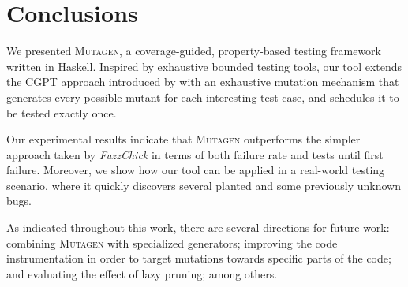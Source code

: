 \documentclass[sigconf, anonymous, review]{acmart}
\newcommand{\fuzzchick}{\textit{FuzzChick}\xspace}
\newcommand{\mutagen}{\textsc{Mutagen}\xspace}
\begin{document}

\section{Conclusions}
\label{sec:conclusions}

We presented \mutagen, a coverage-guided, property-based testing framework
written in Haskell.
%
Inspired by exhaustive bounded testing tools, our tool extends the CGPT approach
introduced by \citeauthor{lampropoulos2019coverage} with an exhaustive mutation
mechanism that generates every possible mutant for each interesting test case,
and schedules it to be tested exactly once.




Our experimental results indicate that \mutagen outperforms the simpler approach
taken by \fuzzchick in terms of both failure rate and tests until first failure.
%
Moreover, we show how our tool can be applied in a real-world testing scenario,
where it quickly discovers several planted and some previously unknown bugs.


As indicated throughout this work, there are several directions for future work:
%
combining \mutagen with specialized generators; improving the code
instrumentation in order to target mutations towards specific parts of the code;
and evaluating the effect of lazy pruning; among others.
\end{document}
